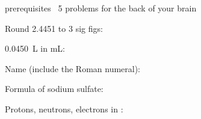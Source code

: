 \documentclass{apchem-worksheet}
\begin{document}
\begin{spiralstrip}{prerequisites \textbullet\ 5 problems for the back of your brain}
  \item Round \num{2.4451} to 3 sig figs: 
  \item \SI{0.0450}{\liter} in mL: 
  \item Name  (include the Roman numeral):
  \item Formula of sodium sulfate: 
  \item Protons, neutrons, electrons in :
\end{spiralstrip}
\end{document}
